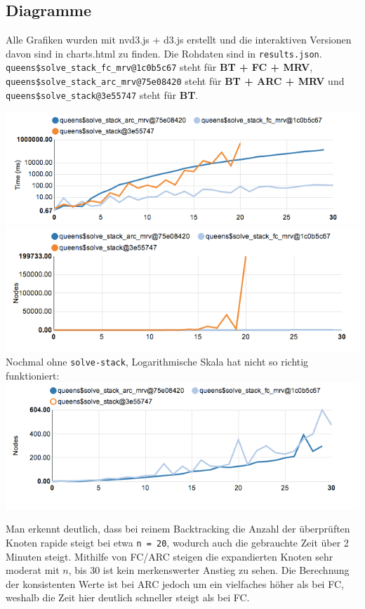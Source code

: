 \documentclass[a4paper,10pt]{article}
\begin{document}
\subsection*{Diagramme}
Alle Grafiken wurden mit nvd3.js + d3.js erstellt und die interaktiven Versionen davon sind in charts.html zu finden. Die Rohdaten sind in \texttt{results.json}. \texttt{queens\$solve\_stack\_fc\_mrv@1c0b5c67} steht für \textbf{BT + FC + MRV}, \texttt{queens\$solve\_stack\_arc\_mrv@75e08420} steht für \textbf{BT + ARC + MRV} und \texttt{queens\$solve\_stack@3e55747} steht für \textbf{BT}.
\begin{center}
\includegraphics[scale=0.7]{chart_one.png} \\
\includegraphics[scale=0.7]{chart_two.png} \\
Nochmal ohne \texttt{solve-stack}, Logarithmische Skala hat nicht so richtig funktioniert:
\includegraphics[scale=0.7]{chart_three.png} \\
\end{center}

Man erkennt deutlich, dass bei reinem Backtracking die Anzahl der überprüften Knoten rapide steigt bei etwa \texttt{n = 20}, wodurch auch die gebrauchte Zeit über 2 Minuten steigt. Mithilfe von FC/ARC steigen die expandierten Knoten sehr moderat mit $n$, bis 30 ist kein merkenswerter Anstieg zu sehen. Die Berechnung der konsistenten Werte ist bei ARC jedoch um ein vielfaches höher als bei FC, weshalb die Zeit hier deutlich schneller steigt als bei FC.
\end{document}
